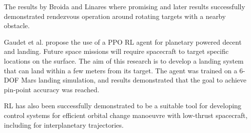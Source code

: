 The results by Broida and Linares \cite{broida2019spacecraft} where promising and later results \cite{hovell2021deep} successfully demonstrated rendezvous operation around rotating targets with a nearby obstacle.

Gaudet et al. \cite{gaudet2018deep} propose the use of a PPO RL agent for planetary powered decent and landing. Future space missions will require spacecraft to target specific locations on the surface. The aim of this research is to develop a landing system that can land within a few meters from its target.
The agent was trained on a 6-DOF Mars landing simulation, and results demonstrated that the goal to achieve pin-point accuracy was reached.

RL has also been successfully demonstrated to be a suitable tool for developing control systems for efficient orbital change manoeuvre with low-thrust spacecraft, including for interplanetary trajectories. \cite{kolosa2019reinforcement, zavoli2020reinforcement, miller2020low} 






